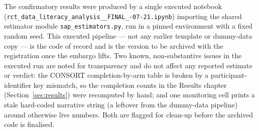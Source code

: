 The confirmatory results were produced by a single executed notebook
(\texttt{rct\_\allowbreak data\_\allowbreak literacy\_\allowbreak analysis\_\_\allowbreak FINAL\_-07-21.\allowbreak ipynb}) importing
the shared estimator module \texttt{sap\_\allowbreak estimators.py}, run in a pinned
environment with a fixed random seed. This executed pipeline --- not any earlier
template or dummy-data copy --- is the code of record and is the version to be
archived with the registration once the embargo lifts. Two known, non-substantive
issues in the executed run are noted for transparency and do not affect any
reported estimate or verdict: the CONSORT completion-by-arm table is broken by a
participant-identifier key mismatch, so the completion counts in
the Results chapter (Section~\ref{sec:results}) were recomputed by hand; and one monitoring cell prints
a stale hard-coded narrative string (a leftover from the dummy-data pipeline)
around otherwise live numbers. Both are flagged for clean-up before the archived
code is finalised.

